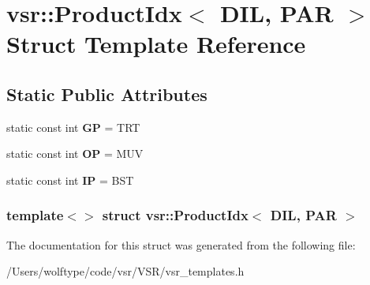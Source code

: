 \hypertarget{structvsr_1_1_product_idx_3_01_d_i_l_00_01_p_a_r_01_4}{\section{vsr\-:\-:Product\-Idx$<$ D\-I\-L, P\-A\-R $>$ Struct Template Reference}
\label{structvsr_1_1_product_idx_3_01_d_i_l_00_01_p_a_r_01_4}
}
\subsection*{Static Public Attributes}
\begin{DoxyCompactItemize}
\item 
\hypertarget{structvsr_1_1_product_idx_3_01_d_i_l_00_01_p_a_r_01_4_a9f455d25839785d2061500e0e2fa16c3}{static const int {\bfseries G\-P} = T\-R\-T}\label{structvsr_1_1_product_idx_3_01_d_i_l_00_01_p_a_r_01_4_a9f455d25839785d2061500e0e2fa16c3}

\item 
\hypertarget{structvsr_1_1_product_idx_3_01_d_i_l_00_01_p_a_r_01_4_ae52d61781f3e48aaad579649636df0d2}{static const int {\bfseries O\-P} = M\-U\-V}\label{structvsr_1_1_product_idx_3_01_d_i_l_00_01_p_a_r_01_4_ae52d61781f3e48aaad579649636df0d2}

\item 
\hypertarget{structvsr_1_1_product_idx_3_01_d_i_l_00_01_p_a_r_01_4_a7d3b787a9e5955149710bde277d63e8e}{static const int {\bfseries I\-P} = B\-S\-T}\label{structvsr_1_1_product_idx_3_01_d_i_l_00_01_p_a_r_01_4_a7d3b787a9e5955149710bde277d63e8e}

\end{DoxyCompactItemize}
\subsubsection*{template$<$$>$ struct vsr\-::\-Product\-Idx$<$ D\-I\-L, P\-A\-R $>$}



The documentation for this struct was generated from the following file\-:\begin{DoxyCompactItemize}
\item 
/\-Users/wolftype/code/vsr/\-V\-S\-R/vsr\-\_\-templates.\-h\end{DoxyCompactItemize}
